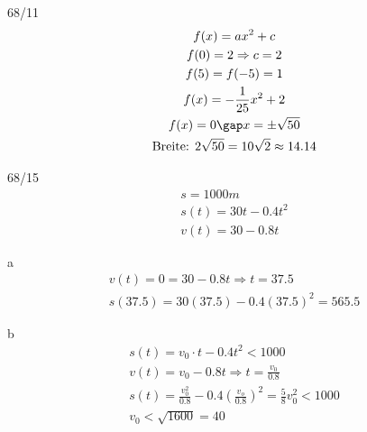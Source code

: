 \begin{exercise}{68/11}
  \begin{gather*}
    f(x) = ax^2 + c \\
    f(0) = 2 \Rightarrow c = 2 \\
    f(5) = f(-5) = 1 \\
    f(x) = -\frac{1}{25}x^2 + 2 \\
    f(x) = 0 \gap x = \pm \sqrt{50} \\
    \text{Breite: } 2\sqrt{50} = 10\sqrt{2} \approx 14.14
  \end{gather*}
\end{exercise}
\begin{exercise}{68/15}
  \begin{gather*}
    s = 1000m \\
    s(t) = 30t - 0.4t^2 \\
    v(t) = 30 - 0.8t
  \end{gather*}
  \item [a]
  \begin{gather*}
    v(t) = 0 = 30 - 0.8t \Rightarrow t = 37.5 \\
    s(37.5) = 30(37.5) - 0.4(37.5)^2 = 565.5
  \end{gather*}
  \item [b]
  \begin{gather*}
    s(t) = v_0 \cdot t - 0.4t^2 < 1000 \\
    v(t) = v_0 - 0.8t \Rightarrow t = \frac{v_0}{0.8} \\
    s(t) = \frac{v_0^2}{0.8} - 0.4(\frac{v_o}{0.8})^2 = \frac{5}{8}v_0^2 < 1000 \\
    v_0 < \sqrt{1600} = 40
  \end{gather*}
\end{exercise}
